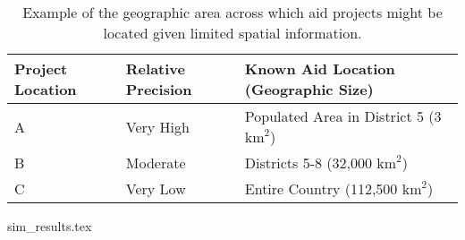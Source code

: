\newpage
\begin{table}[!htbp]
	\begin{tabular}{| l | l | l |}
	\hline
	Project Location & Relative Precision & Known Aid Location (Geographic Size)\\
    \hline
    A &  Very High & Populated Area in District 5 (3 $\text{km}^2$) \\ \hline
    B &  Moderate & Districts 5-8 (32,000 $\text{km}^2$) \\ \hline
    C &  Very Low & Entire Country (112,500 $\text{km}^2$) \\ \hline
	\end{tabular}
	\caption{Example of the geographic area across which aid projects might be located given limited spatial information.}\label{precision_example}
\end{table}

\newpage
{sim_results.tex}

